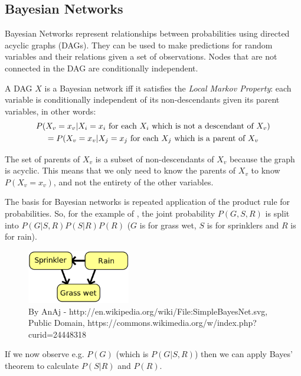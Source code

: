 \documentclass{article}
\begin{document}
\subsection{Bayesian Networks}
Bayesian Networks represent relationships between probabilities using directed acyclic graphs (DAGs).
They can be used to make predictions for random variables and their relations given a set of observations.
Nodes that are not connected in the DAG are conditionally independent.

A DAG $X$ is a Bayesian network iff it satisfies the \emph{Local Markov Property}: each variable is conditionally independent of its non-descendants given its parent variables, in other words:
\begin{multline}
	P(X_v = x_v | X_i = x_i \textup{ for each $X_i$ which is not a descendant of $X_v$}) \\
	= P(X_v = x_v | X_j = x_j \textup{ for each $X_j$ which is a parent of $X_v$}
\end{multline}

\begin{keypointbox}
	The set of parents of $X_v$ is a subset of non-descendants of $X_v$ because the graph is acyclic.
	This means that we only need to know the parents of $X_v$ to know $P(X_v = x_v)$, and not the entirety of the other variables.
\end{keypointbox}

The basis for Bayesian networks is repeated application of the product rule for probabilities.
So, for the example of , the joint probability $P(G, S, R)$ is split into $P(G|S, R)P(S|R)P(R)$ ($G$ is for grass wet, $S$ is for sprinklers and $R$ is for rain).

\begin{figure}[h]
	\center
	\includegraphics[width=0.4\textwidth]{bayes-net.png}
	\caption{By AnAj - http://en.wikipedia.org/wiki/File:SimpleBayesNet.svg, Public Domain, https://commons.wikimedia.org/w/index.php?curid=24448318}
	\label{im:Bayesnet}
\end{figure}

If we now observe e.g. $P(G)$ (which is $P(G|S,R)$) then we can apply Bayes' theorem to calculate $P(S|R)$ and $P(R)$.
\end{document}
